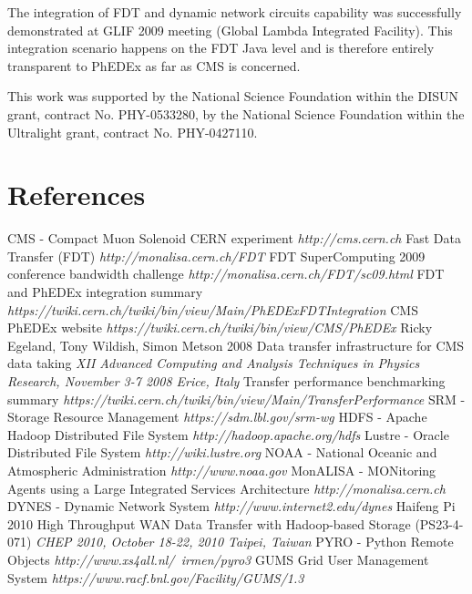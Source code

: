 \documentclass[a4paper]{jpconf}
\begin{document}
The integration of FDT and dynamic network circuits capability was
successfully demonstrated at GLIF 2009 meeting (Global Lambda Integrated
Facility). This integration scenario happens on the FDT Java level and is
therefore entirely transparent to PhEDEx as far as CMS is concerned.




\ack
This work was supported by the National Science Foundation within the DISUN
grant, contract No. PHY-0533280, by the National Science Foundation within the
Ultralight grant, contract No. PHY-0427110.


\section*{References}
\begin{thebibliography}{2}
 CMS - Compact Muon Solenoid CERN experiment
{\it http://cms.cern.ch}
 Fast Data Transfer (FDT) {\it http://monalisa.cern.ch/FDT}
 FDT SuperComputing 2009 conference bandwidth challenge
{\it http://monalisa.cern.ch/FDT/sc09.html}
 FDT and PhEDEx integration summary {\it
https://twiki.cern.ch/twiki/bin/view/Main/PhEDExFDTIntegration}
 CMS PhEDEx website 
{\it https://twiki.cern.ch/twiki/bin/view/CMS/PhEDEx}
 Ricky Egeland, Tony Wildish, Simon Metson 2008 Data
transfer infrastructure for CMS data taking {\it XII Advanced Computing and
Analysis Techniques in Physics Research, November 3-7 2008 Erice, Italy}
 Transfer performance benchmarking summary 
{\it https://twiki.cern.ch/twiki/bin/view/Main/TransferPerformance}
 SRM - Storage Resource Management 
{\it https://sdm.lbl.gov/srm-wg}
 HDFS - Apache Hadoop Distributed File System 
{\it http://hadoop.apache.org/hdfs}
 Lustre - Oracle Distributed File System
{\it http://wiki.lustre.org}
 NOAA - National Oceanic and Atmospheric Administration
{\it http://www.noaa.gov}
 MonALISA - MONitoring Agents using a Large Integrated
Services Architecture {\it http://monalisa.cern.ch}
 DYNES - Dynamic Network System 
{\it  http://www.internet2.edu/dynes}
 Haifeng Pi 2010 High Throughput WAN Data Transfer
with Hadoop-based Storage (PS23-4-071)
{\it CHEP 2010, October 18-22, 2010 Taipei, Taiwan}
 PYRO - Python Remote Objects
{\it http://www.xs4all.nl/~irmen/pyro3}
 GUMS Grid User Management System
{\it https://www.racf.bnl.gov/Facility/GUMS/1.3}
\end{thebibliography}
\end{document}
